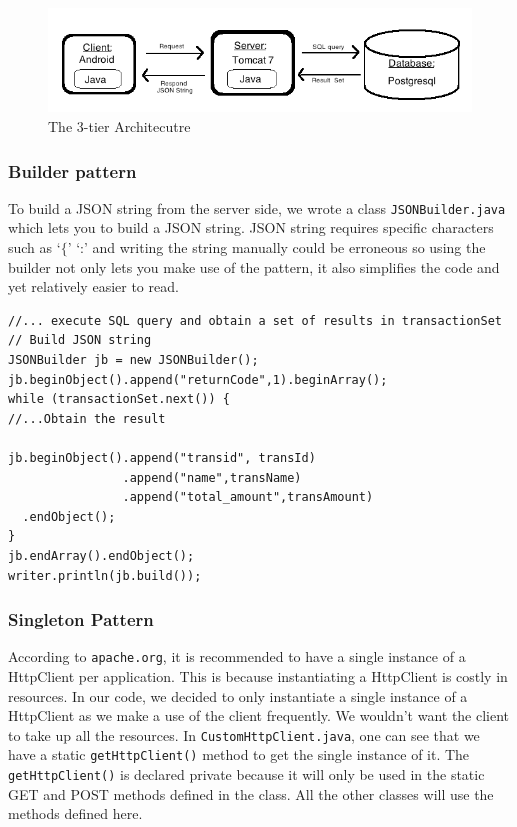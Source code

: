 \documentclass[a4paper,11pt]{article}
\begin{document}
\begin{figure}[ht]
\begin{center}
\advance\leftskip-3cm
\advance\rightskip-3cm
\includegraphics[keepaspectratio=true,scale=0.5]{3tier}
\caption{The 3-tier Architecutre}
\label{visina8}
\end{center}
\end{figure}

\subsubsection*{Builder pattern}
To build a JSON string from the server side, we wrote a class \texttt{JSONBuilder.java} which lets you to build a JSON string. JSON string requires specific characters such as `$\lbrace$' `:' and writing the string manually could be erroneous so using the builder not only lets you make use of the pattern, it also simplifies the code and yet relatively easier to read. 

\begin{verbatim}
//... execute SQL query and obtain a set of results in transactionSet
// Build JSON string
JSONBuilder jb = new JSONBuilder();
jb.beginObject().append("returnCode",1).beginArray();
while (transactionSet.next()) {
//...Obtain the result
						
jb.beginObject().append("transid", transId)
                .append("name",transName)
                .append("total_amount",transAmount)
  .endObject();
}
jb.endArray().endObject();			
writer.println(jb.build());
\end{verbatim}

\subsubsection*{Singleton Pattern}

According to \texttt{apache.org}, it is recommended to have a single instance of a HttpClient per application. This is because instantiating a HttpClient is costly in resources. In our code, we decided to only instantiate a single instance of a HttpClient as we make a use of the client frequently. We wouldn't want the client to take up all the resources. In \texttt{CustomHttpClient.java}, one can see that we have a static \texttt{getHttpClient()} method to get the single instance of it. The \texttt{getHttpClient()} is declared private because it will only be used in the static GET and POST methods defined in the class. All the other classes will use the methods defined here. 
\end{document}

